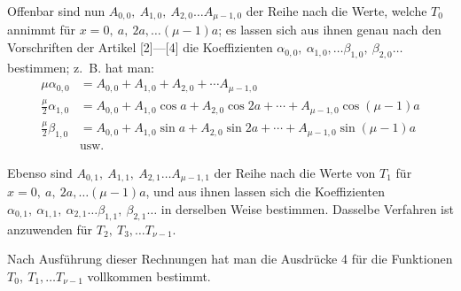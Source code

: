 \begin{landscape}
\par\noindent\hspace*{\parindent}Offenbar sind nun \(A_{0,0},\ A_{1,0},\ A_{2,0}\ldots A_{\mu-1,0}\) der Reihe nach die Werte, welche \(T_0\) annimmt für \(x=0,\ a,\ 2a,\ldots(\mu-1)a\); es lassen sich aus ihnen genau nach den Vorschriften der Artikel [2]---[4] die Koeffizienten \(\alpha_{0,0},\ \alpha_{1,0},\ldots\beta_{1,0},\ \beta_{2,0}\ldots\) bestimmen; z.~B. hat man:
\[
\begin{aligned}
\mu\alpha_{0,0}&=A_{0,0}+A_{1,0}+A_{2,0}+\cdots A_{\mu-1,0}\\[4pt]
\frac\mu2\alpha_{1,0}&=A_{0,0}+A_{1,0}\cos a+A_{2,0}\cos2a+\cdots+A_{\mu-1,0}\cos(\mu-1)a\\[4pt]
\frac\mu2\beta_{1,0}&=A_{0,0}+A_{1,0}\sin a+A_{2,0}\sin2a+\cdots+A_{\mu-1,0}\sin(\mu-1)a\\
 &\text{usw.}
\end{aligned}
\]

\par\noindent\hspace*{\parindent}Ebenso sind \(A_{0,1},\ A_{1,1},\ A_{2,1}\ldots A_{\mu-1,1}\) der Reihe nach die Werte von \(T_1\) für \(x=0,\ a,\ 2a,\ldots(\mu-1)a\), und aus ihnen lassen sich die Koeffizienten \(\alpha_{0,1},\ \alpha_{1,1},\ \alpha_{2,1}\ldots\beta_{1,1},\ \beta_{2,1}\ldots\) in derselben Weise bestimmen. Dasselbe Verfahren ist anzuwenden für \(T_2,\ T_3,\ldots T_{\nu-1}\).

\par\noindent\hspace*{\parindent}Nach Ausführung dieser Rechnungen hat man die Ausdrücke 4 für die Funktionen \(T_0,\ T_1,\ldots T_{\nu-1}\) vollkommen bestimmt.


\end{landscape}
